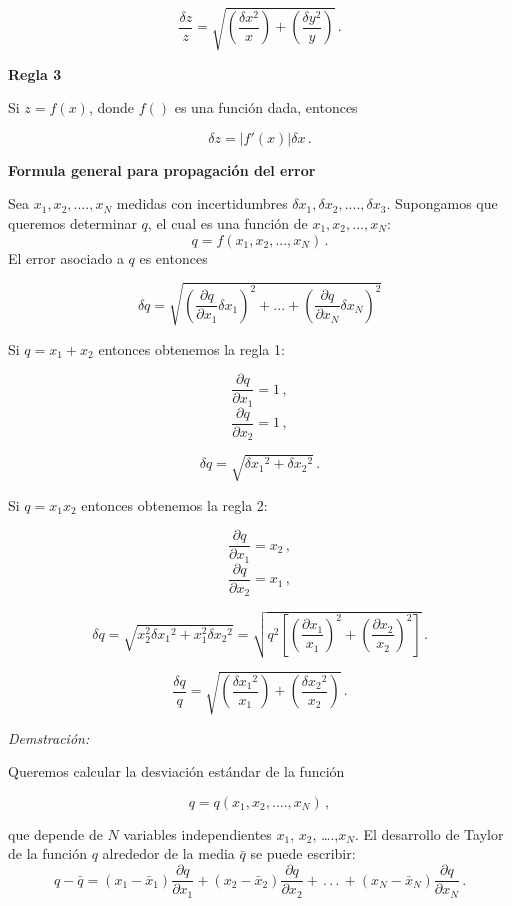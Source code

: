 \documentclass[
]{agujournal2019}
\begin{document}
\[\frac{\delta{z}}{z}=\sqrt{\left(\frac{\delta{x}^2}{x}\right) + \left(\frac{\delta{y}^2}{y}\right)}\,.\]

\vspace{0.5cm}

\textbf{Regla 3}

Si \(z=f(x)\), donde \(f()\) es una función dada, entonces

\[\delta{z}=|f'(x)|\delta{x}\,.\]

\vspace{0.5cm}

\textbf{Formula general para propagación del error}

Sea \(x_1, x_2,....,x_N\) medidas con incertidumbres
\(\delta{x_1},\delta{x_2},....,\delta{x_3}\). Supongamos que queremos
determinar \(q\), el cual es una función de \(x_1,x_2,...,x_N\):
\[q=f(x_1, x_2,...,x_N)\,.\] El error asociado a \(q\) es entonces

\[\delta{q}=\sqrt{\left( \frac{\partial{q}}{\partial{x_1}}\delta{x_1}\right)^2 + ... +
                  \left( \frac{\partial{q}}{\partial{x_N}}\delta{x_N}\right)^2}\]

Si \(q=x_1+x_2\) entonces obtenemos la regla 1:

\[\frac{\partial{q}}{\partial{x_1}}=1\,,\]
\[\frac{\partial{q}}{\partial{x_2}}=1\,,\]

\[\delta{q}=\sqrt{\delta{x_1}^2 + \delta{x_2}^2}\,.\]

Si \(q=x_1x_2\) entonces obtenemos la regla 2:

\[\frac{\partial{q}}{\partial{x_1}}=x_2\,,\]
\[\frac{\partial{q}}{\partial{x_2}}=x_1\,,\]

\[\delta{q}=\sqrt{x^2_2\delta{x_1}^2 + x^2_1\delta{x_2}^2}=\sqrt{q^2\left[ \left(\frac{\partial{x_1}}{x_1}\right)^2 + \left(\frac{\partial{x_2}}{x_2}\right)^2\right]}\,.\]

\[\frac{\delta{q}}{q}=\sqrt{\left(\frac{\delta{x_1}^2}{x_1}\right) + \left(\frac{\delta{x_2}^2}{x_2}\right)}\,.\]

\vspace{0.5cm}

\emph{Demstración:}

Queremos calcular la desviación estándar de la función

\[q=q(x_1, x_2,....,x_N)\,,\]

que depende de \(N\) variables independientes \(x_1\), \(x_2\),
\ldots.,\(x_N\). El desarrollo de Taylor de la función \(q\) alrededor
de la media \(\bar{q}\) se puede escribir:
\[q - \bar{q}=\left(x_1 - \bar{x}_1\right)\frac{\partial{q}}{\partial{x_1}} +
                          \left(x_2 - \bar{x}_2\right)\frac{\partial{q}}{\partial{x_2}}+  \,.\,.\,.\,
                          + \left(x_N - \bar{x}_N\right)\frac{\partial{q}}{\partial{x_N}}\,.\]
\end{document}
